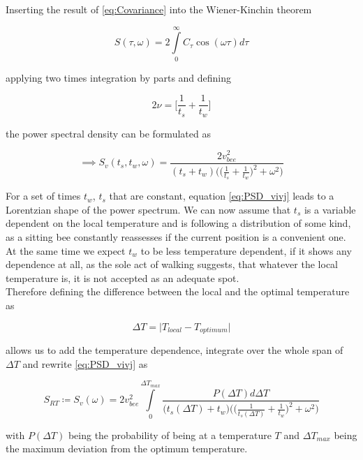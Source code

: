 Inserting the result of \ref{eq:Covariance} into the Wiener-Kinchin theorem

\begin{equation}
\label{eq:Wiener_Kinchin}
    S(\tau,\omega)=2\int\limits_{0}^{\infty}C_{\tau}\cos(\omega \tau)d \tau
\end{equation}

applying two times integration by parts and defining

\begin{equation}
    2 \nu = \Big[ \frac{1}{t_{s}} +  \frac{1}{t_{w}} \Big]
\end{equation}

the power spectral density can be formulated as

\begin{equation}
\label{eq:PSD_vivj}
   \implies S_{v}(t_{s},t_{w},\omega)=\frac{2v_{bee}^{2}}{(t_{s}+t_{w})\Big(\big(\frac{1}{t_{s}}+\frac{1}{t_{w}}\big)^{2}+\omega^{2}\Big)}
\end{equation}

For a set of times $t_{w}$, $t_{s}$ that are constant, equation \ref{eq:PSD_vivj} leads to a Lorentzian shape of the power spectrum.
We can now assume that $t_{s}$ is a variable dependent on the local temperature and is following a distribution of some kind, as a sitting bee constantly reassesses if the current position is a convenient one. At the same time we expect $t_{w}$ to be less temperature dependent, if it shows any dependence at all, as the sole act of walking suggests, that whatever the local temperature is, it is not accepted as an adequate spot.
\\
Therefore defining the difference between the local and the optimal temperature as

\begin{equation}
    \Delta T = \big|T_{local} - T_{optimum}\big|
\end{equation}

allows us to add the temperature dependence, integrate over the whole span of $\Delta T$ and rewrite \ref{eq:PSD_vivj} as

\begin{equation}
\label{eq:PSD_RTS}
    S_{RT} \coloneqq S_{v}(\omega)=2v_{bee}^{2}\int\limits_{0}^{\Delta T_{max}}\frac{P(\Delta T)d\Delta T}{\big(t_{s}(\Delta T)+t_{w}\big)\Big(\big(\frac{1}{t_{s}(\Delta T)}+\frac{1}{t_{w}}\big)^{2}+\omega^{2}\Big)}
\end{equation}

with $P(\Delta T)$ being the probability of being at a temperature $T$ and $\Delta T_{max}$ being the maximum deviation from the optimum temperature.

